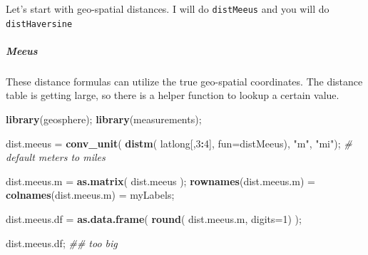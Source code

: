 \documentclass[
]{article}
\newenvironment{Shaded}{\begin{snugshade}}{\end{snugshade}}
\newcommand{\CommentTok}[1]{\textcolor[rgb]{0.56,0.35,0.01}{\textit{#1}}}
\newcommand{\DataTypeTok}[1]{\textcolor[rgb]{0.13,0.29,0.53}{#1}}
\newcommand{\DecValTok}[1]{\textcolor[rgb]{0.00,0.00,0.81}{#1}}
\newcommand{\FloatTok}[1]{\textcolor[rgb]{0.00,0.00,0.81}{#1}}
\newcommand{\KeywordTok}[1]{\textcolor[rgb]{0.13,0.29,0.53}{\textbf{#1}}}
\newcommand{\NormalTok}[1]{#1}
\newcommand{\OperatorTok}[1]{\textcolor[rgb]{0.81,0.36,0.00}{\textbf{#1}}}
\newcommand{\StringTok}[1]{\textcolor[rgb]{0.31,0.60,0.02}{#1}}
\begin{document}
\begin{Shaded}
\end{Shaded}

Let's start with geo-spatial distances. I will do \texttt{distMeeus} and
you will do \texttt{distHaversine}

\hypertarget{meeus}{%
\subparagraph{\texorpdfstring{\textbf{Meeus}}{Meeus}}\label{meeus}}

These distance formulas can utilize the true geo-spatial coordinates.
The distance table is getting large, so there is a helper function to
lookup a certain value.

\begin{Shaded}
\begin{Highlighting}[]
\KeywordTok{library}\NormalTok{(geosphere);}
\KeywordTok{library}\NormalTok{(measurements);}


\NormalTok{dist.meeus =}\StringTok{ }\KeywordTok{conv\_unit}\NormalTok{(  }\KeywordTok{distm}\NormalTok{( latlong[,}\DecValTok{3}\OperatorTok{:}\DecValTok{4}\NormalTok{],}
                  \DataTypeTok{fun=}\NormalTok{distMeeus),  }\StringTok{"m"}\NormalTok{, }\StringTok{"mi"}\NormalTok{);  }\CommentTok{\# default meters to miles}

\NormalTok{dist.meeus.m =}\StringTok{ }\KeywordTok{as.matrix}\NormalTok{( dist.meeus );}
  \KeywordTok{rownames}\NormalTok{(dist.meeus.m) =}\StringTok{ }
\StringTok{  }\KeywordTok{colnames}\NormalTok{(dist.meeus.m) =}\StringTok{ }\NormalTok{myLabels;}

\NormalTok{dist.meeus.df =}\StringTok{ }\KeywordTok{as.data.frame}\NormalTok{( }\KeywordTok{round}\NormalTok{( dist.meeus.m, }\DataTypeTok{digits=}\DecValTok{1}\NormalTok{) );}

\NormalTok{dist.meeus.df;  }\CommentTok{\#\# too big}
\end{Highlighting}
\end{Shaded}
\end{document}
